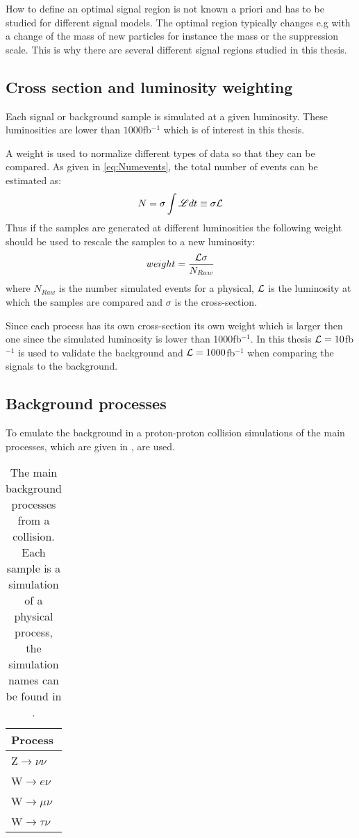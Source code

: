 How to define an optimal signal region is not known a priori and has to be studied for different signal models. The optimal region typically changes e.g with a change of the mass of new particles for instance the \abbrWIMP mass or the suppression scale. This is why there are several different signal regions studied in this thesis.

\subsection{Cross section and luminosity weighting}
Each signal or background sample is simulated at a given luminosity. These luminosities are lower than $1000$fb$^{-1}$ which is of interest in this thesis. 

A weight is used to normalize different types of data so that they can be compared. 
As given in \eqref{eq:Numevents}, the total number of events can be estimated as:
\begin{equation*}
N=\sigma \int \mathscr{L} dt \equiv \sigma \mathcal{L}
\end{equation*}
Thus if the samples are generated at different luminosities the following weight should be used to rescale the samples to a new luminosity:
\begin{equation}
weight=\frac{\mathcal{L} \sigma}{N_{Raw}}
\end{equation}
where $N_{Raw}$ is the number simulated events for a physical, $\mathcal{L}$ is the luminosity at which the samples are compared and $\sigma$ is the cross-section. 

Since each process has its own cross-section its own weight which is larger then one since the simulated luminosity is lower than 1000fb$^{-1}$.
In this thesis $\mathcal{L}=10$fb$^{-1}$ is used to validate the background and $\mathcal{L}=1000$fb$^{-1}$ when comparing the signals to the background.


\subsection{Background processes}
To emulate the background in a proton-proton collision simulations of the main processes, which are given in , are used. 
\begin{table}[ht]
\begin{tabular}{|l|}
\hline
Process \\ \hline
Z$\rightarrow \nu \nu$ \\
W$\rightarrow e\nu$ \\
W$\rightarrow \mu \nu$ \\
W$\rightarrow \tau \nu$ \\ \hline
\end{tabular}
\caption{The main background processes from a collision. Each sample is a simulation of a physical process, the simulation names can be found in .}
\label{tab:backproc2}
\end{table}

